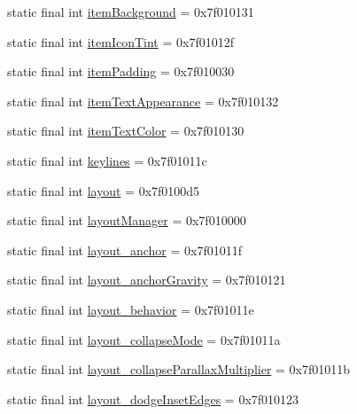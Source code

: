 \begin{CompactItemize}
\item 
static final int \hyperlink{classandroid_1_1support_1_1v7_1_1palette_1_1_r_1_1attr_195efa3df2b896081a9f2527c09d3760}{itemBackground} = 0x7f010131
\item 
static final int \hyperlink{classandroid_1_1support_1_1v7_1_1palette_1_1_r_1_1attr_002ca0eca322058b2d97b01e7cf346d4}{itemIconTint} = 0x7f01012f
\item 
static final int \hyperlink{classandroid_1_1support_1_1v7_1_1palette_1_1_r_1_1attr_ff02c370a887dcf3175eb32f3d072906}{itemPadding} = 0x7f010030
\item 
static final int \hyperlink{classandroid_1_1support_1_1v7_1_1palette_1_1_r_1_1attr_e879d5d3a2aa9fe23e479644b2ab1d33}{itemTextAppearance} = 0x7f010132
\item 
static final int \hyperlink{classandroid_1_1support_1_1v7_1_1palette_1_1_r_1_1attr_86d6ff3eefb08f00a58d1d680f2ff90d}{itemTextColor} = 0x7f010130
\item 
static final int \hyperlink{classandroid_1_1support_1_1v7_1_1palette_1_1_r_1_1attr_183635d6d52af67a1f4a9376313a5d40}{keylines} = 0x7f01011c
\item 
static final int \hyperlink{classandroid_1_1support_1_1v7_1_1palette_1_1_r_1_1attr_f564eb3543ef83560a7f0659d18217b7}{layout} = 0x7f0100d5
\item 
static final int \hyperlink{classandroid_1_1support_1_1v7_1_1palette_1_1_r_1_1attr_3b5f445769ce971a9d7de38b922998fb}{layoutManager} = 0x7f010000
\item 
static final int \hyperlink{classandroid_1_1support_1_1v7_1_1palette_1_1_r_1_1attr_c665825ee3ab1514e43965a9fcb05153}{layout\_\-anchor} = 0x7f01011f
\item 
static final int \hyperlink{classandroid_1_1support_1_1v7_1_1palette_1_1_r_1_1attr_89dd83fdf79273eaa70d6b99ad970642}{layout\_\-anchorGravity} = 0x7f010121
\item 
static final int \hyperlink{classandroid_1_1support_1_1v7_1_1palette_1_1_r_1_1attr_ec129a5ca224a41a7ea13c291b0c3213}{layout\_\-behavior} = 0x7f01011e
\item 
static final int \hyperlink{classandroid_1_1support_1_1v7_1_1palette_1_1_r_1_1attr_9c252166ef1e3e8d6766131b6967d018}{layout\_\-collapseMode} = 0x7f01011a
\item 
static final int \hyperlink{classandroid_1_1support_1_1v7_1_1palette_1_1_r_1_1attr_5a7bf9a2d750003b7eaa8d2aff9942dd}{layout\_\-collapseParallaxMultiplier} = 0x7f01011b
\item 
static final int \hyperlink{classandroid_1_1support_1_1v7_1_1palette_1_1_r_1_1attr_79d7872d98a759180a3ae11196fff731}{layout\_\-dodgeInsetEdges} = 0x7f010123

\end{CompactItemize}
